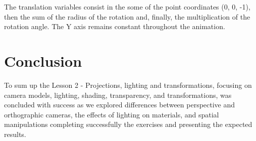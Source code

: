 \documentclass[12pt]{article}
\begin{document}
\noindent
The translation variables consist in the some of the point coordinates (0, 0, -1), then the sum of the radius of the rotation and, finally, the multiplication of the rotation angle. The Y axis remains constant throughout the animation. 

\section*{Conclusion}
\label{Concl}

To sum up the Lesson 2 - Projections, lighting and transformations, focusing on camera models, lighting, shading, transparency, and transformations, was concluded with success as we explored differences between perspective and orthographic cameras, the effects of lighting on materials, and spatial manipulations completing successfully the exercises and presenting the expected results.

\end{document}
